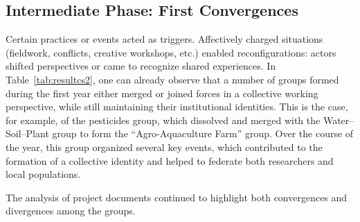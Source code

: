 \documentclass{article}
\begin{document}
\subsection{Intermediate Phase: First Convergences}\label{sec:phaseIntermediaire}

Certain practices or events acted as triggers. Affectively charged situations (fieldwork, conflicts, creative workshops, etc.) enabled reconfigurations: actors shifted perspectives or came to recognize shared experiences. In Table~\ref{tab:resultcs2}, one can already observe that a number of groups formed during the first year either merged or joined forces in a collective working perspective, while still maintaining their institutional identities. This is the case, for example, of the pesticides group, which dissolved and merged with the Water–Soil–Plant group to form the “Agro-Aquaculture Farm” group. Over the course of the year, this group organized several key events, which contributed to the formation of a collective identity and helped to federate both researchers and local populations.  

The analysis of project documents continued to highlight both convergences and divergences among the groups.  
\end{document}
